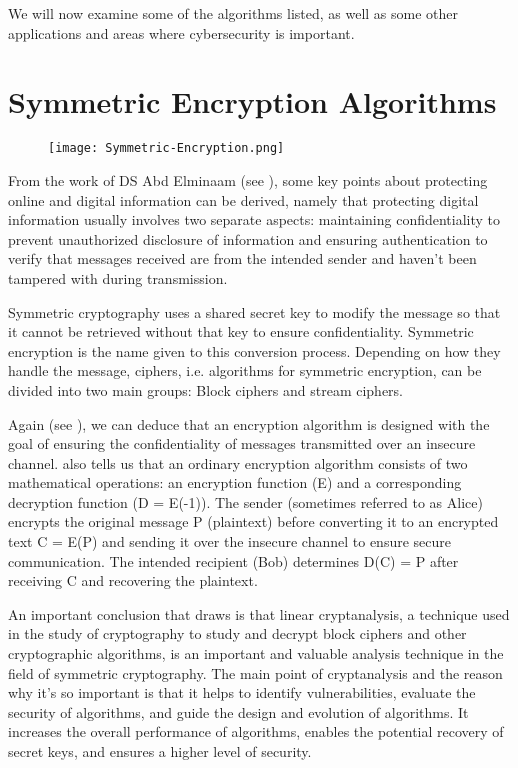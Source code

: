 \documentclass[a4paper,12pt]{report}
\begin{document}
We will now examine some of the algorithms listed, as well as some other applications and areas where cybersecurity is important.

\section{Symmetric Encryption Algorithms}

\begin{figure}[htp]
    \centering
    \texttt{[image: Symmetric-Encryption.png]}
    \label{fig: Symmetric-Encryption-Algorithm}
\end{figure}

From the work of DS Abd Elminaam (see \cite{DS}), some key points about protecting online and digital information can be derived, namely that protecting digital information usually involves two separate aspects: maintaining confidentiality to prevent unauthorized disclosure of information and ensuring authentication to verify that messages received are from the intended sender and haven't been tampered with during transmission.

Symmetric cryptography uses a shared secret key to modify the message so that it cannot be retrieved without that key to ensure confidentiality. Symmetric encryption is the name given to this conversion process. Depending on how they handle the message, ciphers, i.e. algorithms for symmetric encryption, can be divided into two main groups: Block ciphers and stream ciphers.

Again (see \cite{DS}), we can deduce that an encryption algorithm is designed with the goal of ensuring the confidentiality of messages transmitted over an insecure channel. \cite{DS} also tells us that an ordinary encryption algorithm consists of two mathematical operations: an encryption function (E) and a corresponding decryption function (D = E(-1)). The sender (sometimes referred to as Alice) encrypts the original message P (plaintext) before converting it to an encrypted text C = E(P) and sending it over the insecure channel to ensure secure communication. The intended recipient (Bob) determines D(C) = P after receiving C and recovering the plaintext.

An important conclusion that \cite{DS} draws is that linear cryptanalysis, a technique used in the study of cryptography to study and decrypt block ciphers and other cryptographic algorithms, is an important and valuable analysis technique in the field of symmetric cryptography. The main point of cryptanalysis and the reason why it's so important is that it helps to identify vulnerabilities, evaluate the security of algorithms, and guide the design and evolution of algorithms. It increases the overall performance of algorithms, enables the potential recovery of secret keys, and ensures a higher level of security.
\end{document}
